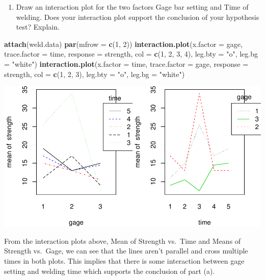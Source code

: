 \documentclass[12pt,]{article}
\newenvironment{Shaded}{\begin{snugshade}}{\end{snugshade}}
\newcommand{\KeywordTok}[1]{\textcolor[rgb]{0.13,0.29,0.53}{\textbf{#1}}}
\newcommand{\DataTypeTok}[1]{\textcolor[rgb]{0.13,0.29,0.53}{#1}}
\newcommand{\DecValTok}[1]{\textcolor[rgb]{0.00,0.00,0.81}{#1}}
\newcommand{\StringTok}[1]{\textcolor[rgb]{0.31,0.60,0.02}{#1}}
\newcommand{\NormalTok}[1]{#1}
\providecommand{\tightlist}{%
  \setlength{\itemsep}{0pt}\setlength{\parskip}{0pt}}
\begin{document}
\begin{enumerate}
\def\labelenumi{(\alph{enumi})}
\setcounter{enumi}{1}
\tightlist
\item
  Draw an interaction plot for the two factors Gage bar setting and Time
  of welding. Does your interaction plot support the conclusion of your
  hypothesis test? Explain.
\end{enumerate}

\begin{Shaded}
\begin{Highlighting}[]
\KeywordTok{attach}\NormalTok{(weld.data)}
\KeywordTok{par}\NormalTok{(}\DataTypeTok{mfrow =} \KeywordTok{c}\NormalTok{(}\DecValTok{1}\NormalTok{, }\DecValTok{2}\NormalTok{))}
\KeywordTok{interaction.plot}\NormalTok{(}\DataTypeTok{x.factor =}\NormalTok{ gage, }\DataTypeTok{trace.factor =}\NormalTok{ time, }\DataTypeTok{response =}\NormalTok{ strength,}
\DataTypeTok{col =} \KeywordTok{c}\NormalTok{(}\DecValTok{1}\NormalTok{, }\DecValTok{2}\NormalTok{, }\DecValTok{3}\NormalTok{, }\DecValTok{4}\NormalTok{), }\DataTypeTok{leg.bty =} \StringTok{"o"}\NormalTok{, }\DataTypeTok{leg.bg =} \StringTok{"white"}\NormalTok{) }
\KeywordTok{interaction.plot}\NormalTok{(}\DataTypeTok{x.factor =}\NormalTok{ time, }\DataTypeTok{trace.factor =}\NormalTok{ gage, }\DataTypeTok{response =}\NormalTok{ strength,}
\DataTypeTok{col =} \KeywordTok{c}\NormalTok{(}\DecValTok{1}\NormalTok{, }\DecValTok{2}\NormalTok{, }\DecValTok{3}\NormalTok{), }\DataTypeTok{leg.bty =} \StringTok{"o"}\NormalTok{, }\DataTypeTok{leg.bg =} \StringTok{"white"}\NormalTok{)}
\end{Highlighting}
\end{Shaded}

\includegraphics{Markdown_HW_6_files/figure-latex/unnamed-chunk-7-1.pdf}

From the interaction plots above, Mean of Strength vs.~Time and Means of
Strength vs.~Gage, we can see that the lines aren't parallel and cross
multiple times in both plots. This implies that there is some
interaction between gage setting and welding time which supports the
conclusion of part (a).
\end{document}
